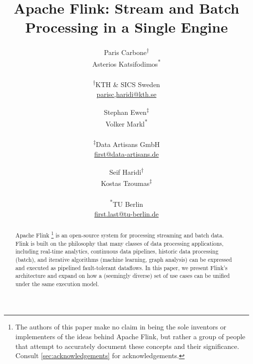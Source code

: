 \documentclass[11pt]{article}
\begin{document}
\title{Apache Flink\texttrademark: Stream and Batch Processing in a Single Engine}

\author{Paris Carbone\textsuperscript{$\dagger$} \\ Asterios Katsifodimos\textsuperscript{*} \\\\ \small{ \textsf{\small \textsuperscript{$\dagger$}KTH \& SICS Sweden}} \\ \small \href{parisc,haridi@kth.se}{parisc,haridi@kth.se}
\and Stephan Ewen\textsuperscript{$\ddagger$} \\ Volker Markl\textsuperscript{*} \\\\ \small \textsf{\textsuperscript{$\ddagger$}Data Artisans GmbH} \\ \small \href{first@data-artisans.de}{first@data-artisans.de}
\and Seif Haridi\textsuperscript{$\dagger$} \\ Kostas Tzoumas\textsuperscript{$\ddagger$} \\\\ \small \textsf{\textsuperscript{*}TU Berlin} \\ \small \href{fist.last@tu-berlin.de}{first.last@tu-berlin.de}
%
\vspace{-5mm}
}




\maketitle

\begin{abstract}
Apache Flink \footnote{The authors of this paper make no claim in being the sole inventors or implementers of the ideas behind Apache Flink, but rather a group of people that attempt to accurately document these concepts and their significance. Consult \autoref{sec:acknowledgements} for acknowledgements.} is an open-source system for processing streaming and batch data. Flink is built on the philosophy that many classes of data processing applications, including real-time analytics, continuous data pipelines, historic data processing (batch), and iterative algorithms (machine learning, graph analysis) can be expressed and executed as pipelined fault-tolerant dataflows. In this paper, we present Flink's architecture and expand on how a (seemingly diverse) set of use cases can be unified under the same execution model.
\end{abstract}
\end{document}
